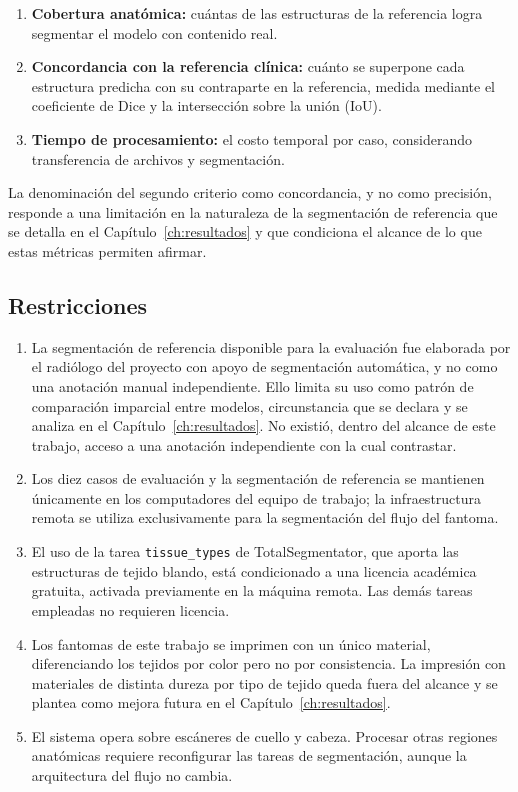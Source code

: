 \begin{enumerate}
  \item \textbf{Cobertura anatómica:} cuántas de las estructuras de la referencia logra segmentar el modelo con contenido real.
  \item \textbf{Concordancia con la referencia clínica:} cuánto se superpone cada estructura predicha con su contraparte en la referencia, medida mediante el coeficiente de Dice y la intersección sobre la unión (IoU).
  \item \textbf{Tiempo de procesamiento:} el costo temporal por caso, considerando transferencia de archivos y segmentación.
\end{enumerate}

La denominación del segundo criterio como concordancia, y no como precisión, responde a una limitación en la naturaleza de la segmentación de referencia que se detalla en el Capítulo~\ref{ch:resultados} y que condiciona el alcance de lo que estas métricas permiten afirmar.\\

\subsection{Restricciones}

\begin{enumerate}
  \item La segmentación de referencia disponible para la evaluación fue elaborada por el radiólogo del proyecto con apoyo de segmentación automática, y no como una anotación manual independiente. Ello limita su uso como patrón de comparación imparcial entre modelos, circunstancia que se declara y se analiza en el Capítulo~\ref{ch:resultados}. No existió, dentro del alcance de este trabajo, acceso a una anotación independiente con la cual contrastar.
  \item Los diez casos de evaluación y la segmentación de referencia se mantienen únicamente en los computadores del equipo de trabajo; la infraestructura remota se utiliza exclusivamente para la segmentación del flujo del fantoma.
  \item El uso de la tarea \texttt{tissue\_types} de TotalSegmentator, que aporta las estructuras de tejido blando, está condicionado a una licencia académica gratuita, activada previamente en la máquina remota. Las demás tareas empleadas no requieren licencia.
  \item Los fantomas de este trabajo se imprimen con un único material, diferenciando los tejidos por color pero no por consistencia. La impresión con materiales de distinta dureza por tipo de tejido queda fuera del alcance y se plantea como mejora futura en el Capítulo~\ref{ch:resultados}.
  \item El sistema opera sobre escáneres de cuello y cabeza. Procesar otras regiones anatómicas requiere reconfigurar las tareas de segmentación, aunque la arquitectura del flujo no cambia.
\end{enumerate}

